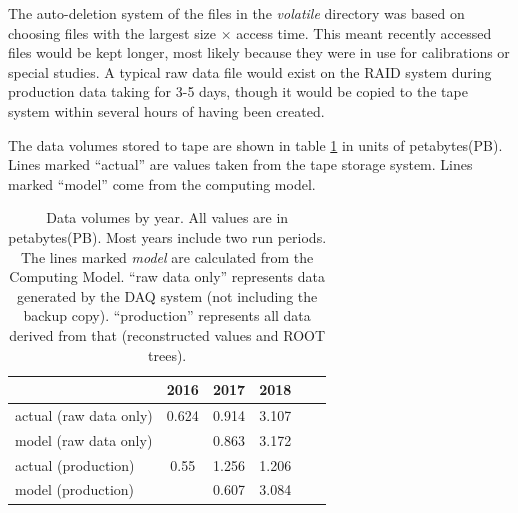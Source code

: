 The auto-deletion system of the files in the \textit{volatile} directory was based on choosing files with the largest size $\times$ access time. This meant recently accessed files would be kept longer, most likely because they were in use for calibrations or special studies. A typical raw data file would exist on the RAID system during production data taking for 3-5 days, though it would be copied to the tape system within several hours of having been created.

The data volumes stored to tape are shown in table \ref{tab:online_data_volumes} in units of petabytes(PB). Lines marked ``actual'' are values taken from the tape storage system. Lines marked ``model'' come from the \GX computing model\cite{gx3821}.

\begin{table}[]
    \centering
    \begin{tabular}{|l|c|c|c|c|c|}
    \hline
                           & \textbf{2016}  & \textbf{2017}  & \textbf{2018} \\
    \hline
    actual (raw data only) & 0.624 & 0.914 & 3.107 \\
    \hline
     model (raw data only) &       & 0.863 & 3.172 \\
    \hline
    \hline
    actual (production)    & 0.55  & 1.256 & 1.206 \\
    \hline
     model (production)    &       & 0.607 & 3.084 \\
    \hline
    \end{tabular}
    \caption{\GX Data volumes by year. All values are in petabytes(PB). Most years include two run periods. The lines marked \textit{model} are calculated from the \GX Computing Model\cite{gx3821}. ``raw data only'' represents data generated by the DAQ system (not including the backup copy). ``production'' represents all data derived from that (reconstructed values and ROOT trees). }
    \label{tab:online_data_volumes}
\end{table}


